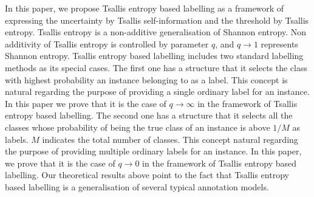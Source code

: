 \documentclass[a4paper,conference]{IEEEtran}
\begin{document}
In this paper, we propose Tsallis entropy based labelling as a framework of expressing the uncertainty by Tsallis self-information and the threshold by Tsallis entropy.
Tsallis entropy is a non-additive generalisation of Shannon entropy.
Non additivity of Tsallis entropy is controlled by parameter $q$, and $q \rightarrow 1$ represents Shannon entropy.
Tsallis entropy based labelling includes two standard labelling methods as its special cases. 
The first one has a structure that it selects the class with highest probability an instance belonging to as a label. 
This concept is natural regarding the purpose of providing a single ordinary label for an instance.
In this paper we prove that it is the case of $q \rightarrow \infty$ in the framework of Tsallis entropy based labelling.
The second one has a structure that it selects all the classes whose probability of being the true class of an instance is above $1/M$ as labels.
$M$ indicates the total number of classes.
This concept natural regarding the purpose of providing multiple ordinary labels for an instance.
In this paper, we prove that it is the case of $q \rightarrow 0$ in the framework of Tsallis entropy based labelling.
Our theoretical results above point to the fact that Tsallis entropy based labelling is a generalisation of several typical annotation models.
\end{document}
